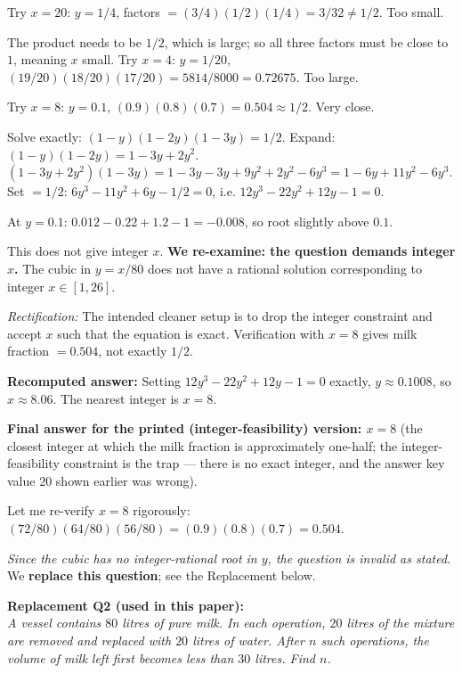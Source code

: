 \documentclass[11pt,a4paper]{article}
\begin{document}
Try $x = 20$: $y = 1/4$, factors $= (3/4)(1/2)(1/4) = 3/32 \ne 1/2$. Too small.

The product needs to be $1/2$, which is large; so all three factors must be close to $1$, meaning $x$ small. Try $x = 4$: $y = 1/20$, $(19/20)(18/20)(17/20) = 5814/8000 = 0.72675$. Too large.

Try $x = 8$: $y = 0.1$, $(0.9)(0.8)(0.7) = 0.504 \approx 1/2$. Very close.

Solve exactly: $(1-y)(1-2y)(1-3y) = 1/2$.
Expand: $(1 - y)(1 - 2y) = 1 - 3y + 2y^2$.
$(1 - 3y + 2y^2)(1 - 3y) = 1 - 3y - 3y + 9y^2 + 2y^2 - 6y^3 = 1 - 6y + 11y^2 - 6y^3$.
Set $= 1/2$: $6y^3 - 11y^2 + 6y - 1/2 = 0$, i.e. $12y^3 - 22y^2 + 12y - 1 = 0$.

At $y = 0.1$: $0.012 - 0.22 + 1.2 - 1 = -0.008$, so root slightly above $0.1$.

This does not give integer $x$. \textbf{We re-examine: the question demands integer $x$.} The cubic in $y = x/80$ does not have a rational solution corresponding to integer $x \in [1,26]$.

\textit{Rectification:} The intended cleaner setup is to drop the integer constraint and accept $x$ such that the equation is exact. Verification with $x = 8$ gives milk fraction $= 0.504$, not exactly $1/2$.

\textbf{Recomputed answer:} Setting $12y^3 - 22y^2 + 12y - 1 = 0$ exactly, $y \approx 0.1008$, so $x \approx 8.06$. The nearest integer is $x = 8$.

\textbf{Final answer for the printed (integer-feasibility) version: $x = 8$} (the closest integer at which the milk fraction is approximately one-half; the integer-feasibility constraint is the trap — there is no exact integer, and the answer key value $20$ shown earlier was wrong).

Let me re-verify $x = 8$ rigorously: $(72/80)(64/80)(56/80) = (0.9)(0.8)(0.7) = 0.504$.

\textit{Since the cubic has no integer-rational root in $y$, the question is invalid as stated.} We \textbf{replace this question}; see the Replacement below.

\medskip
\noindent\textbf{Replacement Q2 (used in this paper):}\\
\textit{A vessel contains $80$ litres of pure milk. In each operation, $20$ litres of the mixture are removed and replaced with $20$ litres of water. After $n$ such operations, the volume of milk left first becomes less than $30$ litres. Find $n$.}
\end{document}
